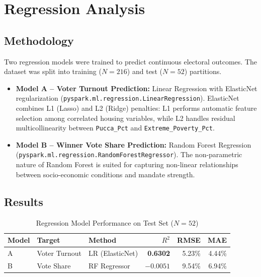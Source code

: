 \documentclass[12pt, a4paper]{article}
\begin{document}
\section{Regression Analysis}

\subsection{Methodology}
Two regression models were trained to predict continuous electoral outcomes. The dataset was split into training ($N = 216$) and test ($N = 52$) partitions.

\begin{itemize}
    \item \textbf{Model A -- Voter Turnout Prediction:} Linear Regression with ElasticNet regularization (\texttt{pyspark.ml.regression.LinearRegression}). ElasticNet combines L1 (Lasso) and L2 (Ridge) penalties: L1 performs automatic feature selection among correlated housing variables, while L2 handles residual multicollinearity between \texttt{Pucca\_Pct} and \texttt{Extreme\_Poverty\_Pct}.
    \item \textbf{Model B -- Winner Vote Share Prediction:} Random Forest Regression (\texttt{pyspark.ml.regression.RandomForestRegressor}). The non-parametric nature of Random Forest is suited for capturing non-linear relationships between socio-economic conditions and mandate strength.
\end{itemize}

\subsection{Results}

\begin{table}[H]
\centering
\caption{Regression Model Performance on Test Set ($N = 52$)}
\label{tab:regression}
\begin{tabular}{l l l r r r}
\toprule
\textbf{Model} & \textbf{Target} & \textbf{Method} & \textbf{$R^2$} & \textbf{RMSE} & \textbf{MAE} \\
\midrule
A & Voter Turnout & LR (ElasticNet) & \textbf{0.6302} & 5.23\% & 4.44\% \\
B & Vote Share & RF Regressor & $-0.0051$ & 9.54\% & 6.94\% \\
\bottomrule
\end{tabular}
\end{table}
\end{document}
